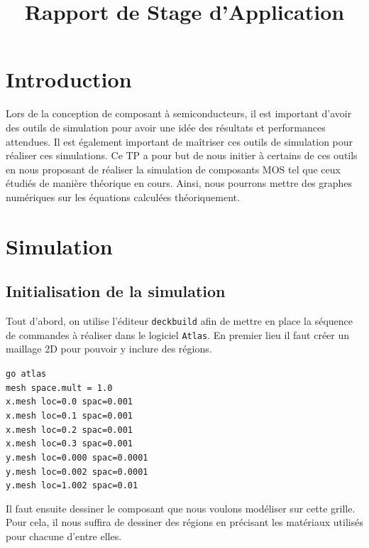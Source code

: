 \documentclass[a4paper,11pt]{report}
\title{Rapport de Stage d'Application}
\begin{document}


\chapter{Introduction}
Lors de la conception de composant à semiconducteurs, il est important d'avoir des outils de simulation pour avoir une idée des résultats et performances attendues. Il est également important de maîtriser ces outils de simulation pour réaliser ces simulations. Ce TP a pour but de nous initier à certains de ces outils en nous proposant de réaliser la simulation de composants MOS tel que ceux étudiés de manière théorique en cours. Ainsi, nous pourrons mettre des graphes  numériques sur les équations calculées théoriquement.

\chapter{Simulation}

\section{Initialisation de la simulation}

Tout d'abord, on utilise l'éditeur \texttt{deckbuild} afin de mettre en place la séquence de commandes à réaliser dans le logiciel \texttt{Atlas}. En premier lieu il faut créer un maillage 2D pour pouvoir y inclure des régions.


\noindent\texttt{go atlas\\mesh space.mult = 1.0\\x.mesh loc=0.0 spac=0.001\\x.mesh loc=0.1 spac=0.001\\x.mesh loc=0.2 spac=0.001\\x.mesh loc=0.3 spac=0.001\\y.mesh loc=0.000 spac=0.0001\\y.mesh loc=0.002 spac=0.0001\\y.mesh loc=1.002 spac=0.01\\}


Il faut ensuite dessiner le composant que nous voulons modéliser sur cette grille. Pour cela, il nous suffira de dessiner des régions en précisant les matériaux utilisés pour chacune d'entre elles.


\end{document}
